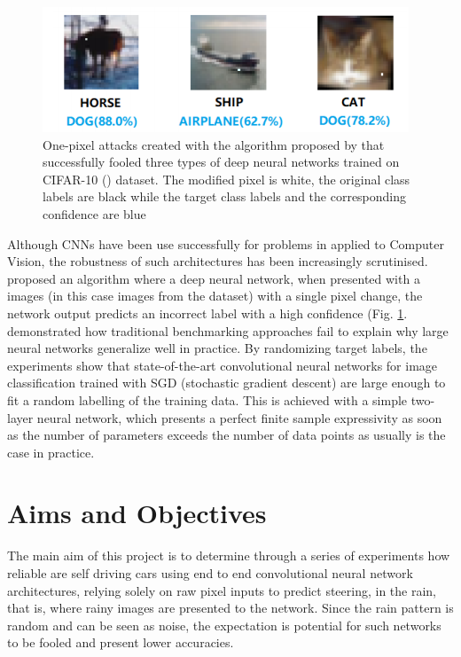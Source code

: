
\begin{figure}[ht]
 \centering 
 \includegraphics[scale=1]{Figures/one-pixel-attack.png}
 \caption{One-pixel  attacks  created  with the algorithm proposed by \cite{Su_2019} that  successfully  fooled  three  types  of deep neural networks trained  on  CIFAR-10 (\cite{CIFAR_10}) dataset. The modified pixel is white, the original  class  labels  are   black while  the  target  class  labels  and  the corresponding confidence are blue}
 \label{fig:one-pixel-attack}
\end{figure}

Although CNNs have been use successfully for problems in applied to Computer Vision, the robustness of such architectures has been increasingly scrutinised. \cite{Su_2019} proposed an algorithm where a deep neural network, when presented with a images (in this case images from the \cite{CIFAR_10} dataset) with a single pixel change, the network output predicts an incorrect label with a high confidence (Fig. \ref{fig:one-pixel-attack}.  
\cite{zhang2017understanding} demonstrated how traditional benchmarking approaches fail to explain why large neural networks generalize well in practice. By randomizing target labels, the experiments show that state-of-the-art convolutional neural networks for image classification trained with SGD (stochastic gradient descent) are large enough to fit a random labelling of the training data. This is achieved with a simple two-layer neural network, which presents a perfect finite sample expressivity as soon as the number of parameters exceeds the number of data points as usually is the case in practice.

\section{Aims and Objectives}


The main aim of this project is to determine through a series of experiments how reliable are self driving cars using end to end convolutional neural network architectures, relying solely on raw pixel inputs to predict steering, in the rain, that is, where rainy images are presented to the network. Since the rain pattern is random and can be seen as noise, the expectation is potential for such networks to be fooled and present lower accuracies.

